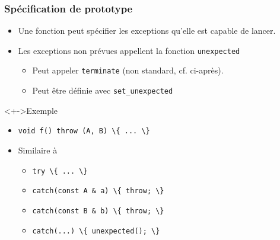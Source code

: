 \begin{frame}
\frametitle{Spécification de prototype}
\begin{itemize}[<+->]
\item Une fonction peut spécifier les exceptions qu'elle est capable de lancer.
\item Les exceptions non prévues appellent la fonction \texttt{unexpected}
	\begin{itemize}
	\item Peut appeler \texttt{terminate} (non standard, cf. ci-après).
	\item Peut être définie avec \texttt{set\_unexpected}
	\end{itemize}
\end{itemize}
\begin{exampleblock}<+->{Exemple}
	\begin{itemize}
	\item \lstinline|void f() throw (A, B) \{ ... \}|
	\item Similaire à 
		\begin{itemize}
		\item \lstinline|try \{ ... \}|
		\item \lstinline|catch(const A & a) \{ throw; \}|
		\item \lstinline|catch(const B & b) \{ throw; \}|
		\item \lstinline|catch(...) \{ unexpected(); \}|
		\end{itemize}
	\end{itemize}
\end{exampleblock}
\end{frame}

